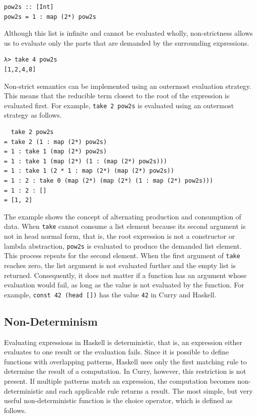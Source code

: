 \documentclass[a4paper, 11pt, fleqn, twoside, abstract=on]{scrreprt}
\newcommand{\hinl}[1]{\texttt{#1}}
\begin{document}
\begin{verbatim}
pow2s :: [Int]
pow2s = 1 : map (2*) pow2s
\end{verbatim}

Although this list is infinite and cannot be evaluated wholly, non-strictness allows us to evaluate only the parts that are demanded by the surrounding expressions.

\begin{verbatim}
λ> take 4 pow2s
[1,2,4,8]
\end{verbatim}

Non-strict semantics can be implemented using an outermost evaluation strategy.
This means that the reducible term closest to the root of the expression is evaluated first.
For example, \hinl{take 2 pow2s} is evaluated using an outermost strategy as follows.

\begin{verbatim}
  take 2 pow2s
= take 2 (1 : map (2*) pow2s)
= 1 : take 1 (map (2*) pow2s)
= 1 : take 1 (map (2*) (1 : (map (2*) pow2s)))
= 1 : take 1 (2 * 1 : map (2*) (map (2*) pow2s))
= 1 : 2 : take 0 (map (2*) (map (2*) (1 : map (2*) pow2s)))
= 1 : 2 : []
= [1, 2]
\end{verbatim}

The example shows the concept of alternating production and consumption of data.
When \hinl{take} cannot consume a list element because its second argument is not in head normal form, that is, the root expression is not a constructor or lambda abstraction, \hinl{pow2s} is evaluated to produce the demanded list element.
This process repeats for the second element.
When the first argument of \hinl{take} reaches zero, the list argument is not evaluated further and the empty list is returned.
Consequently, it does not matter if a function has an argument whose evaluation would fail, as long as the value is not evaluated by the function.
For example, \hinl{const 42 (head [])} has the value \hinl{42} in Curry and Haskell.

\subsection{Non-Determinism}
Evaluating expressions in Haskell is deterministic, that is, an expression either evaluates to one result or the evaluation fails.
Since it is possible to define functions with overlapping patterns, Haskell uses only the first matching rule to determine the result of a computation.
In Curry, however, this restriction is not present.
If multiple patterns match an expression, the computation becomes non-deterministic and each applicable rule returns a result.
The most simple, but very useful non-deterministic function is the choice operator, which is defined as follows.
\end{document}
